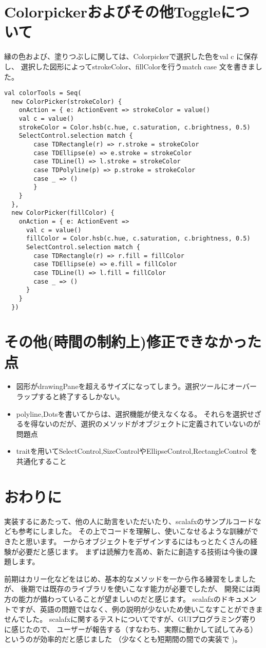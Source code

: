 \documentclass [11pt] {jsarticle}
\begin{document}
\section{Colorpickerおよびその他Toggleについて}
縁の色および、塗りつぶしに関しては、Colorpickerで選択した色をval c に保存し、
選択した図形によってstrokeColor、fillColorを行うmatch case 文を書きました。
\begin{verbatim}
val colorTools = Seq(
  new ColorPicker(strokeColor) {
    onAction = { e: ActionEvent => strokeColor = value()
    val c = value()
    strokeColor = Color.hsb(c.hue, c.saturation, c.brightness, 0.5)
    SelectControl.selection match {
        case TDRectangle(r) => r.stroke = strokeColor
        case TDEllipse(e) => e.stroke = strokeColor
        case TDLine(l) => l.stroke = strokeColor
        case TDPolyline(p) => p.stroke = strokeColor
        case _ => ()
        }
    }
  },
  new ColorPicker(fillColor) {
    onAction = { e: ActionEvent =>
      val c = value()
      fillColor = Color.hsb(c.hue, c.saturation, c.brightness, 0.5)
      SelectControl.selection match {
        case TDRectangle(r) => r.fill = fillColor
        case TDEllipse(e) => e.fill = fillColor
        case TDLine(l) => l.fill = fillColor
        case _ => ()
      }
    }
  })
\end{verbatim}
\section{その他(時間の制約上)修正できなかった点}
\begin{itemize}
\item 図形がdrawingPaneを超えるサイズになってしまう。選択ツールにオーバーラップすると終了するしかない。
\item polyline,Dotsを書いてからは、選択機能が使えなくなる。
それらを選択せざるを得ないのだが、選択のメソッドがオブジェクトに定義されていないのが問題点
\item traitを用いてSelectControl,SizeControlやEllipseControl,RectangleControl
を共通化すること
\end{itemize}
\section {おわりに}
実装するにあたって、他の人に助言をいただいたり、scalafxのサンプルコードなども参考にしました。
その上でコードを理解し、使いこなせるような訓練ができたと思います。
一からオブジェクトをデザインするにはもっとたくさんの経験が必要だと感じます。
まずは読解力を高め、新たに創造する技術は今後の課題します。

前期はカリー化などをはじめ、基本的なメソッドを一から作る練習をしましたが、
後期では既存のライブラリを使いこなす能力が必要でしたが、
開発には両方の能力が備わっていることが望ましいのだと感じます。
scalafxのドキュメントですが、英語の問題ではなく、例の説明が少ないため使いこなすことができませんでした。
scalafxに関するテストについてですが、GUIプログラミング寄りに感じたので、
ユーザーが報告する（すなわち、実際に動かして試してみる）というのが効率的だと感じました
（少なくとも短期間の間での実装で
)。
\end{document}
